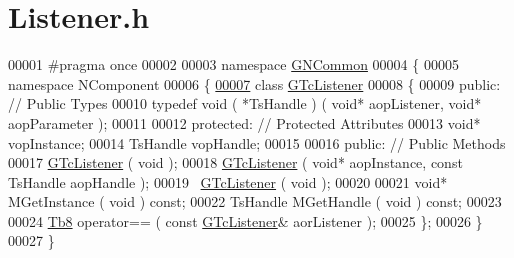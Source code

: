 \hypertarget{_listener_8h_source}{}\section{Listener.\+h}
\label{_listener_8h_source}

\begin{DoxyCode}
00001 \textcolor{preprocessor}{#pragma once}
00002 
00003 \textcolor{keyword}{namespace }\mbox{\hyperlink{namespace_g_n_common}{GNCommon}}
00004 \{
00005    \textcolor{keyword}{namespace }NComponent
00006    \{
\mbox{\hyperlink{class_g_n_common_1_1_n_component_1_1_g_tc_listener}{00007}}       \textcolor{keyword}{class }\mbox{\hyperlink{class_g_n_common_1_1_n_component_1_1_g_tc_listener}{GTcListener}}
00008       \{
00009       \textcolor{keyword}{public}:        \textcolor{comment}{// Public Types}
00010          \textcolor{keyword}{typedef} void ( *TsHandle ) ( \textcolor{keywordtype}{void}* aopListener, \textcolor{keywordtype}{void}* aopParameter );
00011 
00012       \textcolor{keyword}{protected}:     \textcolor{comment}{// Protected Attributes}
00013          \textcolor{keywordtype}{void}*    vopInstance;
00014          TsHandle vopHandle;
00015 
00016       \textcolor{keyword}{public}:        \textcolor{comment}{// Public Methods}
00017          \mbox{\hyperlink{class_g_n_common_1_1_n_component_1_1_g_tc_listener}{GTcListener}}  ( \textcolor{keywordtype}{void} );
00018          \mbox{\hyperlink{class_g_n_common_1_1_n_component_1_1_g_tc_listener}{GTcListener}}  ( \textcolor{keywordtype}{void}* aopInstance, \textcolor{keyword}{const} TsHandle aopHandle );
00019          ~\mbox{\hyperlink{class_g_n_common_1_1_n_component_1_1_g_tc_listener}{GTcListener}} ( \textcolor{keywordtype}{void} );
00020 
00021          \textcolor{keywordtype}{void}*    MGetInstance ( \textcolor{keywordtype}{void} ) \textcolor{keyword}{const};
00022          TsHandle MGetHandle   ( \textcolor{keywordtype}{void} ) \textcolor{keyword}{const};
00023 
00024          \mbox{\hyperlink{namespace_g_n_common_a8115dc7ed53b6e5b52e6bfde1632ea74}{Tb8}} operator== ( \textcolor{keyword}{const} \mbox{\hyperlink{class_g_n_common_1_1_n_component_1_1_g_tc_listener}{GTcListener}}& aorListener );
00025       \};
00026    \}
00027 \}
\end{DoxyCode}

